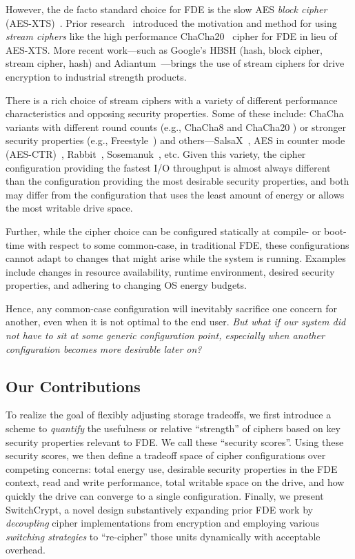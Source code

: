 However, the de facto standard choice for FDE is the slow AES \emph{block
cipher} (AES-XTS)~\cite{AES, AES-XTS}. Prior research~\cite{StrongBox}
introduced the motivation and method for using \emph{stream ciphers} like the
high performance ChaCha20~\cite{ChaCha20} cipher for FDE in lieu of AES-XTS.
More recent work---such as Google's HBSH
(hash, block cipher, stream cipher, hash) and Adiantum~\cite{HBSH,
Adiantum}---brings the use of stream ciphers for drive encryption to industrial strength products.

There is a rich choice of stream ciphers with a variety of different performance characteristics
and opposing security properties. Some of these include: ChaCha variants with
different round counts (e.g., ChaCha8 \cite{ChaCha8} and ChaCha20
\cite{ChaCha20}) or stronger security properties (e.g.,
Freestyle~\cite{Freestyle}) and others---SalsaX~\cite{SalsaX}, AES in counter
mode (AES-CTR)~\cite{AES-CTR}, Rabbit~\cite{Rabbit}, Sosemanuk~\cite{Sosemanuk},
etc. Given this variety, the cipher configuration providing the fastest I/O throughput
is almost always different than the configuration providing the most desirable
security properties, and both may differ from the configuration that uses the
least amount of energy or allows the most writable drive space.

Further, while the cipher choice can be configured statically at compile- or
boot-time with respect to some common-case, in traditional FDE, these
configurations cannot adapt to changes that might arise while the system is
running. Examples include changes in resource availability, runtime environment,
desired security properties, and adhering to changing OS energy budgets.

Hence, any common-case configuration will inevitably sacrifice one concern for
another, even when it is not optimal to the end user. \emph{But what if our
system did not have to sit at some generic configuration point, especially when
another configuration becomes more desirable later on?}

\subsection{Our Contributions}

To realize the goal of flexibly adjusting storage tradeoffs, we first introduce 
a scheme to \emph{quantify} the usefulness
or relative ``strength'' of ciphers based on key security properties relevant to
FDE. We call these ``security scores''. Using these security scores, we then
define a tradeoff space of cipher configurations over competing concerns: total
energy use, desirable security properties in the FDE context, read and write
performance, total writable space on the drive, and how quickly the drive can
converge to a single configuration. Finally, we present SwitchCrypt, a novel
design substantively expanding prior FDE work by \emph{decoupling} cipher
implementations from encryption and employing various \emph{switching
strategies} to ``re-cipher'' those units dynamically with acceptable overhead.

